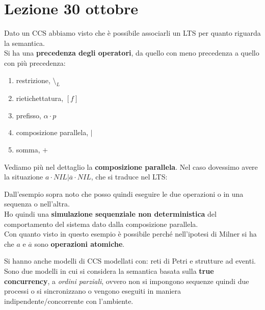 \section{Lezione 30 ottobre}
Dato un CCS abbiamo visto che è possibile associarli un LTS per quanto riguarda la semantica.\\ Si ha una \textbf{precedenza degli operatori}, da quello con meno precedenza a quello con più precedenza: \begin{enumerate} 
    \item restrizione, $\setminus_L$
    \item rietichettatura, $[f]$
    \item prefisso, $\alpha \cdot p$
    \item composizione parallela, $|$
    \item somma, $+$
\end{enumerate}
Vediamo più nel dettaglio la \textbf{composizione parallela}. Nel caso dovessimo avere la situazione $a \cdot NIL | \overline{a} \cdot NIL$, che si traduce nel LTS:

\begin{center}
  \end{center}
Dall'esempio sopra noto che posso quindi eseguire le due operazioni o in una sequenza o nell'altra.\\ 
Ho quindi una \textbf{simulazione sequenziale non deterministica} del comportamento del sistema dato dalla composizione parallela.\\
Con quanto visto in questo esempio è possibile perché nell'ipotesi di Milner si ha
che $a$ e $\overline{a}$ sono \textbf{operazioni atomiche}.

Si hanno anche modelli di CCS modellati con:  reti di Petri e strutture ad eventi. Sono due modelli in cui si considera la semantica basata sulla \textbf{true concurrency}, a \textit{ordini parziali}, ovvero non si impongono sequenze quindi due processi o si sincronizzano o vengono eseguiti in maniera indipendente/concorrente con l'ambiente.

